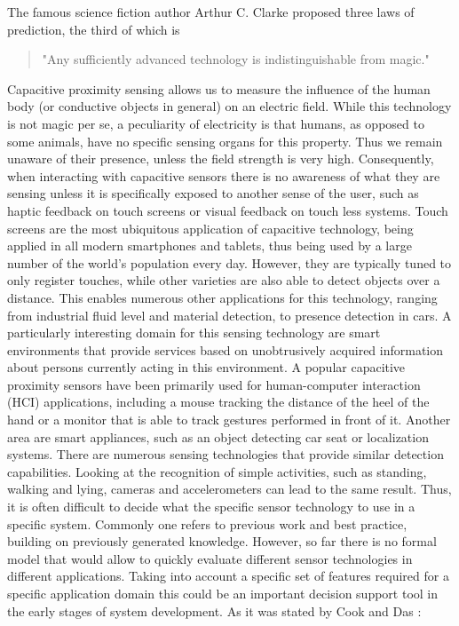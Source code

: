 The famous science fiction author Arthur C. Clarke proposed three laws of prediction, the third of which is 
\begin{quote}
"Any sufficiently advanced technology is indistinguishable from magic." \cite{clarke1962hazards} 
\end{quote}
Capacitive proximity sensing allows us to measure the influence of the human body (or conductive objects in general) on an electric field. While this technology is not magic per se, a peculiarity of electricity is that humans, as opposed to some animals, have no specific sensing organs for this property. Thus we remain unaware of their presence, unless the field strength is very high. Consequently, when interacting with capacitive sensors there is no awareness of what they are sensing unless it is specifically exposed to another sense of the user, such as haptic feedback on touch screens or visual feedback on touch less systems. Touch screens are the most ubiquitous application of capacitive technology, being applied in all modern smartphones and tablets, thus being used by a large number of the world’s population every day. However, they are typically tuned to only register touches, while other varieties are also able to detect objects over a distance. This enables numerous other applications for this technology, ranging from industrial fluid level and material detection, to presence detection in cars. A particularly interesting domain for this sensing technology are smart environments that provide services based on unobtrusively acquired information about persons currently acting in this environment. A popular capacitive proximity sensors have been primarily used for human-computer interaction (HCI) applications, including a mouse tracking the distance of the heel of the hand or a monitor that is able to track gestures performed in front of it. Another area are smart appliances, such as an object detecting car seat or localization systems. There are numerous sensing technologies that provide similar detection capabilities. Looking at the recognition of simple activities, such as standing, walking and lying, cameras and accelerometers can lead to the same result. Thus, it is often difficult to decide what the specific sensor technology to use in a specific system. Commonly one refers to previous work and best practice, building on previously generated knowledge. However, so far there is no formal model that would allow to quickly evaluate different sensor technologies in different applications. Taking into account a specific set of features required for a specific application domain this could be an important decision support tool in the early stages of system development. As it was stated by Cook and Das \cite{cook2007smart}:
